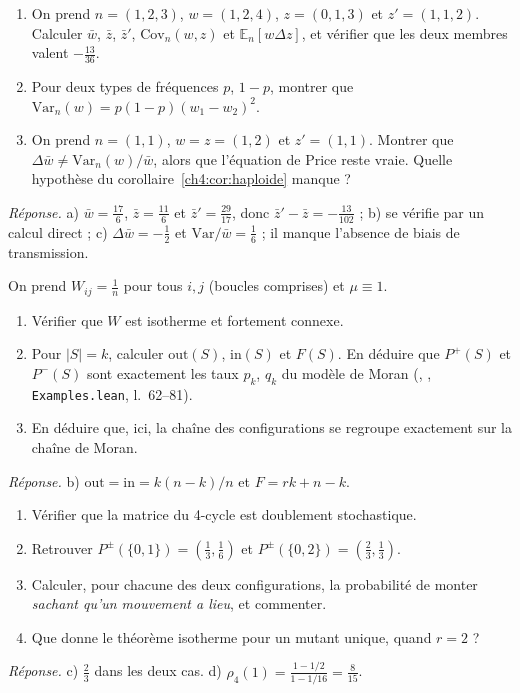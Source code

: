 \begin{exercise}
\begin{enumerate}[label=\alph*),itemsep=0pt]
\item On prend $n=(1,2,3)$, $w=(1,2,4)$, $z=(0,1,3)$ et $z'=(1,1,2)$. Calculer $\bar w$, $\bar z$, $\bar z'$,
$\mathrm{Cov}_n(w,z)$ et $\mathbb E_n[w\Delta z]$, et vérifier que les deux membres valent $-\frac{13}{36}$.
\item Pour deux types de fréquences $p$, $1-p$, montrer que $\mathrm{Var}_n(w)=p(1-p)(w_1-w_2)^2$.
\item On prend $n=(1,1)$, $w=z=(1,2)$ et $z'=(1,1)$. Montrer que $\Delta\bar w\ne\mathrm{Var}_n(w)/\bar w$, alors que
l'équation de Price reste vraie. Quelle hypothèse du corollaire~\ref{ch4:cor:haploide} manque ?
\end{enumerate}
\emph{Réponse.} a) $\bar w=\frac{17}6$, $\bar z=\frac{11}6$ et $\bar z'=\frac{29}{17}$, donc
$\bar z'-\bar z=-\frac{13}{102}$ ; b) se vérifie par un calcul
direct ; c) $\Delta\bar w=-\frac12$ et $\mathrm{Var}/\bar w=\frac16$ ; il manque l'absence de biais de
transmission.
\end{exercise}

\begin{exercise}
On prend $W_{ij}=\frac1n$ pour tous $i,j$ (boucles comprises) et $\mu\equiv1$.
\begin{enumerate}[label=\alph*),itemsep=0pt]
\item Vérifier que $W$ est isotherme et fortement connexe.
\item Pour $|S|=k$, calculer $\mathrm{out}(S)$, $\mathrm{in}(S)$ et $F(S)$. En déduire que $P^{+}(S)$ et $P^{-}(S)$
sont exactement les taux $p_k$, $q_k$ du modèle de Moran (, ,
\texttt{Examples.lean}, l.~62--81).
\item En déduire que, ici, la chaîne des configurations se regroupe exactement sur la chaîne de Moran.
\end{enumerate}
\emph{Réponse.} b) $\mathrm{out}=\mathrm{in}=k(n-k)/n$ et $F=rk+n-k$.
\end{exercise}

\begin{exercise}
\begin{enumerate}[label=\alph*),itemsep=0pt]
\item Vérifier que la matrice du 4-cycle est doublement stochastique.
\item Retrouver $P^{\pm}(\{0,1\})=(\frac13,\frac16)$ et $P^{\pm}(\{0,2\})=(\frac23,\frac13)$.
\item Calculer, pour chacune des deux configurations, la probabilité de monter \emph{sachant qu'un mouvement a
lieu}, et commenter.
\item Que donne le théorème isotherme pour un mutant unique, quand $r=2$ ?
\end{enumerate}
\emph{Réponse.} c) $\frac23$ dans les deux cas. d) $\rho_4(1)=\frac{1-1/2}{1-1/16}=\frac8{15}$.
\end{exercise}

